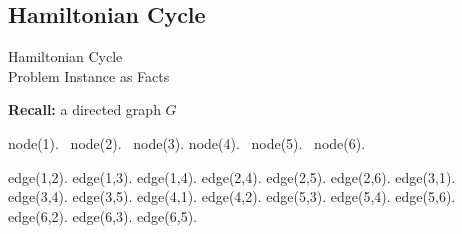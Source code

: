 \subsection{Hamiltonian Cycle}
\begin{frame}{Hamiltonian Cycle\\
  \normalsize Problem Instance as Facts}

  \begin{block}{\textbf{Recall:} a directed graph $G$}
  \begin{minipage}[t]{0.5\linewidth}
  \vspace*{1mm}
  \begin{semiverbatim}
  node(1). \ node(2). \ node(3).
  node(4). \ node(5). \ node(6).
  \end{semiverbatim}

  \small
  \begin{semiverbatim}
  edge(1,2). edge(1,3). edge(1,4).
  edge(2,4). edge(2,5). edge(2,6).
  edge(3,1). edge(3,4). edge(3,5).
  edge(4,1). edge(4,2).
  edge(5,3). edge(5,4). edge(5,6).
  edge(6,2). edge(6,3). edge(6,5).
  \end{semiverbatim}
  \end{minipage}
  \small{\,}
  \begin{minipage}[t]{0.45\linewidth}
  
  \end{minipage}
  \end{block}
\end{frame}

